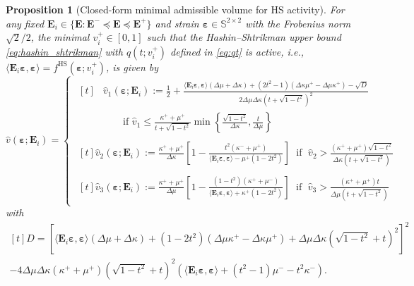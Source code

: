 \documentclass[10pt,a4paper]{amsart}
\newtheorem{proposition}{Proposition}
\newcommand{\Ei}{\tensf{E}_i}                       %
\newcommand{\Emax}{\tensf{E}^{+}}                   %
\newcommand{\Emin}{\tensf{E}^{-}}                   %
\newcommand{\strain}{\tenss{\varepsilon}}           %
\newcommand{\tensf}[1]{\bm{\mathbf{#1}}}            %
\newcommand{\tenss}[1]{\bm{\mathbf{#1}}}            %
\begin{document}
\begin{proposition}[Closed-form minimal admissible volume for HS activity]\label{prop:explicit_volume}
    For any fixed $\Ei \in \{\tensf{E}: \Emin \preceq \tensf{E} \preceq \Emax\}$ and strain $\strain \in \mathbb{S}^{2\times2}$ with the Frobenius norm $\sqrt{2}/2$, the minimal $v_i^+ \in [0,1]$ such that the Hashin--Shtrikman upper bound \eqref{eq:hashin_shtrikman} with $q(t;v_i^+)$ defined in \eqref{eq:qt} is active, i.e., $\langle \Ei \strain, \strain\rangle = f^{\mathrm{HS}}(\strain;v_i^+)$, is given by
    \begin{equation}
        \hat{v}(\strain;\Ei) =
    \begin{cases}
        \begin{aligned}[t]
            &\hat{v}_1 (\strain;\Ei) :=
            \frac{1}{2} + \frac{\langle\Ei\strain, \strain\rangle(\Delta\mu + \Delta\kappa) + (2t^2-1)(\Delta\kappa \mu^+ -\Delta\mu \kappa^+) - \sqrt{D}}{2 \Delta\mu \Delta\kappa (t + \sqrt{1 - t^2})^2}\\
            &\qquad \text{if } \hat{v}_1 \le \frac{\kappa^++\mu^+}{t + \sqrt{1-t^2}} \min\left\{ \frac{\sqrt{1-t^2}}{\Delta\kappa}, \frac{t}{\Delta \mu} \right\}
        \end{aligned}\\
        \begin{aligned}[t]
            \hat{v}_2 (\strain;\Ei) := \frac{\kappa^+ + \mu^+}{\Delta\kappa}\left[1 - \frac{t^2 (\kappa^- + \mu^+)}{ \langle\Ei\strain, \strain\rangle - \mu^+ (1 - 2t^2)}\right] \;\text{ if }\; \hat{v}_2 > \frac{(\kappa^+ + \mu^+)\sqrt{1-t^2}}{\Delta\kappa(t + \sqrt{1-t^2})}
        \end{aligned}\\
        \begin{aligned}[t]
            \hat{v}_3 (\strain;\Ei) := \frac{\kappa^+ + \mu^+}{\Delta\mu} \left[1 - \frac{(1-t^2) (\kappa^+ + \mu^-)}{\langle\Ei\strain, \strain\rangle + \kappa^+ (1 - 2t^2)}\right] \;\text{ if }\; \hat{v}_3 > \frac{(\kappa^+ + \mu^+)t}{\Delta\mu(t + \sqrt{1-t^2})}
        \end{aligned}
    \end{cases}
    \end{equation}
    with
    \begin{equation}\label{eq:det}
        \begin{multlined}[t]
        D = \left[\langle\Ei\strain, \strain\rangle (\Delta\mu + \Delta\kappa) + (1 - 2t^2) (\Delta\mu \kappa^+ - \Delta\kappa\mu^+) + \Delta\mu \Delta\kappa (\sqrt{1-t^2} + t)^2\right]^2\\
         - 4 \Delta\mu \Delta\kappa (\kappa^+ + \mu^+) (\sqrt{1-t^2} + t)^2 (\langle\Ei\strain, \strain\rangle + (t^2-1)\mu^- - t^2\kappa^-).
        \end{multlined}
    \end{equation}
\end{proposition}
\end{document}
